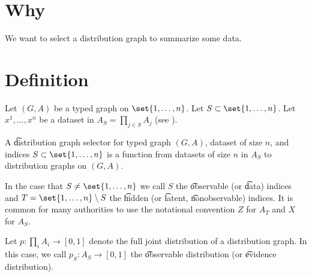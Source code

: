

\section*{Why}

We want to select a distribution graph to summarize some data.

\section*{Definition}

Let $(G, A)$ be a typed graph on $\set{1, \dots , n}$.
Let $S \subset \set{1, \dots , n}$.
Let $x^1, \dots , x^n$ be a dataset in $A_S = \prod_{j \in S} A_j$ (see ).

A \t{distribution graph selector} for typed graph $(G, A)$, dataset of size $n$, and indices $S \subset\set{1, \dots , n}$ is a function from datasets of size $n$ in $A_S$ to distribution graphs on $(G, A)$.

In the case that $S \neq\set{1, \dots , n}$ we call $S$ the \t{observable} (or \t{data}) indices and $T = \set{1,\dots ,n} \setminus S$ the \t{hidden} (or \t{latent}, \t{nonobservable}) indices.
It is common for many authorities to use the notational convention $Z$ for $A_T$ and $X$ for $A_S$.

Let $p: \prod_{i} A_i \to [0, 1]$ denote the full joint distribution of a distribution graph.
In this case, we call $p_{S}: A_S \to [0, 1]$ the \t{observable distribution} (or \t{evidence distribution}).


\blankpage